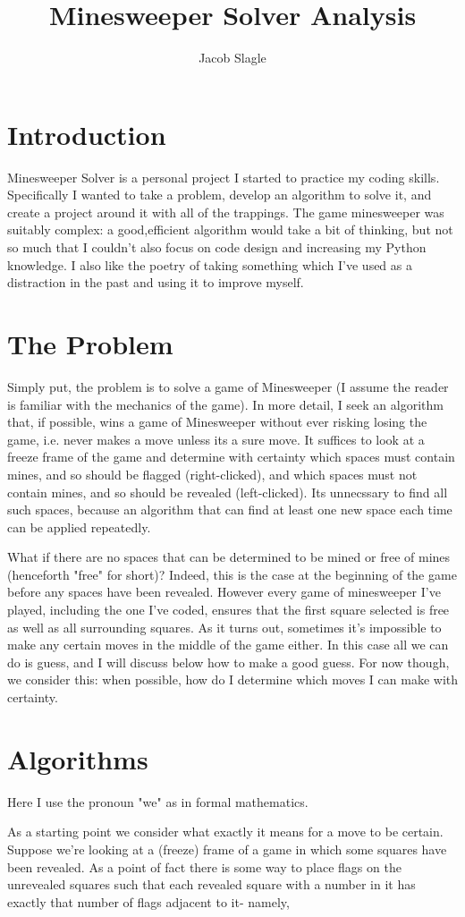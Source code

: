 \documentclass{article}
\title{Minesweeper Solver Analysis}
\author{Jacob Slagle}
\begin{document}
	\maketitle
	
	\section*{Introduction}
	Minesweeper Solver is a personal project I started to practice my coding skills. Specifically I wanted to take a problem, develop an algorithm to solve it, and create a project around it with all of the trappings. The game minesweeper was suitably complex: a good,efficient algorithm would take a bit of thinking, but not so much that I couldn't also focus on code design and increasing my Python knowledge. I also like the poetry of taking something which I've used as a distraction in the past and using it to improve myself.
	
	\section*{The Problem}
	Simply put, the problem is to solve a game of Minesweeper (I assume the reader is familiar with the mechanics of the game). In more detail, I seek an algorithm that, if possible, wins a game of Minesweeper without ever risking losing the game, i.e. never makes a move unless its a sure move. It suffices to look at a freeze frame of the game and determine with certainty which spaces must contain mines, and so should be flagged (right-clicked), and which spaces must not contain mines, and so should be revealed (left-clicked). Its unnecssary to find all such spaces, because an algorithm that can find at least one new space each time can be applied repeatedly.
	
	What if there are no spaces that can be determined to be mined or free of mines (henceforth "free" for short)? Indeed, this is the case at the beginning of the game before any spaces have been revealed. However every game of minesweeper I've played, including the one I've coded, ensures that the first square selected is free as well as all surrounding squares. As it turns out, sometimes it's impossible to make any certain moves in the middle of the game either. In this case all we can do is guess, and I will discuss below how to make a good guess. For now though, we consider this: when possible, how do I determine which moves I can make with certainty.
	
	\section*{Algorithms}
	Here I use the pronoun "we" as in formal mathematics.
	
	As a starting point we consider what exactly it means for a move to be certain. Suppose we're looking at a (freeze) frame of a game in which some squares have been revealed. As a point of fact there is some way to place flags on the unrevealed squares such that each revealed square with a number in it has exactly that number of flags adjacent to it- namely, 
	 
	
	
	
\end{document}
